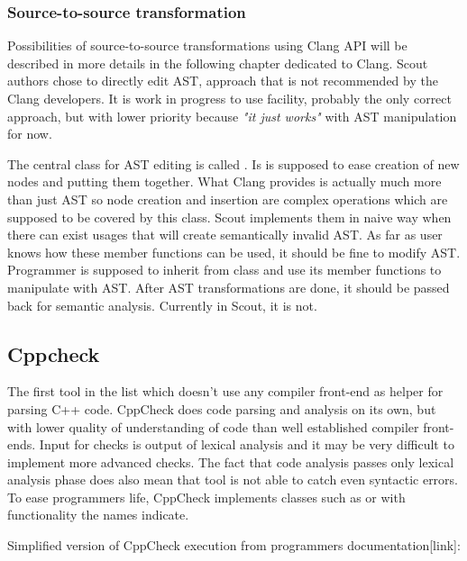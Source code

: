\subsubsection{Source-to-source transformation}
Possibilities of source-to-source transformations using Clang API will be described in more details in the following chapter dedicated to Clang. Scout authors chose to directly edit AST, approach that is not recommended by the Clang developers. It is work in progress to use  facility, probably the only correct approach, but with lower priority because \textit{"it just works"} with AST manipulation for now.

The central class for AST editing is called . Is is supposed to ease creation of new nodes and putting them together. What Clang provides is actually much more than just AST so node creation and insertion are complex operations which are supposed to be covered by this class. Scout implements them in naive way when there can exist usages that will create semantically invalid AST. As far as user knows how these member functions can be used, it should be fine to modify AST. Programmer is supposed to inherit from  class and use its member functions to manipulate with AST. After AST transformations are done, it should be passed back for semantic analysis. Currently in Scout, it is not.

\subsection{Cppcheck}
The first tool in the list which doesn't use any compiler front-end as helper for parsing C++ code. CppCheck does code parsing and analysis on its own, but with lower quality of understanding of code than well established compiler front-ends. Input for checks is output of lexical analysis and it may be very difficult to implement more advanced checks. The fact that code analysis passes only lexical analysis phase does also mean that tool is not able to catch even syntactic errors. To ease programmers life, CppCheck implements classes such as  or  with functionality the names indicate.

Simplified version of CppCheck execution from programmers documentation[link]:

